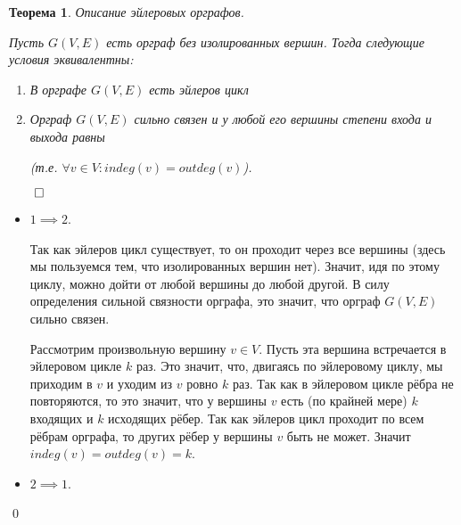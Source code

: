 \documentclass[a4paper,12pt,leqno]{article}
\theoremstyle{plain} %
\newtheorem{theorem}{Теорема}
\theoremstyle{definition} %
\renewenvironment{proof}{$\qed$}{{\qed}} %
\begin{document}
\begin{theorem} \textit{Описание эйлеровых орграфов.}

	Пусть $G(V,E)$ есть орграф без изолированных вершин. Тогда следующие условия эквивалентны:
	
	\begin{enumerate}
		\item В орграфе $G(V,E)$ есть эйлеров цикл
		\item Орграф $G(V,E)$ сильно связен и у любой его вершины степени входа и выхода равны
		
		(т.е. $\forall v \in V: indeg(v)=outdeg(v)$).
	\end{enumerate}

\end{theorem}

\begin{proof}

\begin{itemize}
    \item $1 \implies 2$.
    
    Так как эйлеров цикл существует, то он проходит через все вершины (здесь мы пользуемся тем, что изолированных вершин нет). Значит, идя по этому циклу, можно дойти от любой вершины до любой другой. В силу определения сильной связности орграфа, это значит, что орграф $G(V,E)$ сильно связен.
    
    Рассмотрим произвольную вершину $v \in V$. Пусть эта вершина встречается в эйлеровом цикле $k$ раз. Это значит, что, двигаясь по эйлеровому циклу, мы приходим в $v$ и уходим из $v$ ровно $k$ раз. Так как в эйлеровом цикле рёбра не повторяются, то это значит, что у вершины $v$ есть (по крайней мере) $k$ входящих и $k$ исходящих рёбер. Так как эйлеров цикл проходит по всем рёбрам орграфа, то других рёбер у вершины $v$ быть не может. Значит $indeg(v) = outdeg(v) = k$.
    
    \item $2 \implies 1$.
    

\end{itemize}
\end{proof}
\end{document}
